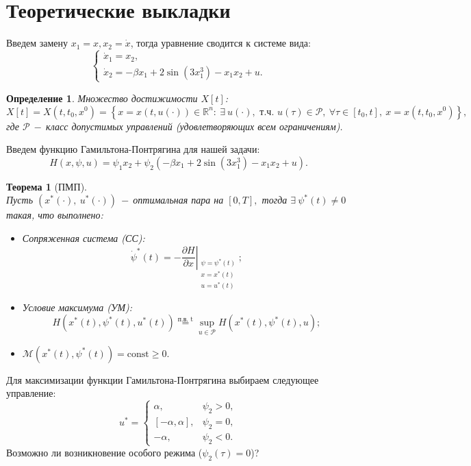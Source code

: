 \documentclass{article}
\begin{document}
\section{Теоретические выкладки}
Введем замену $x_1 = x, x_2 = \dot{x}$, тогда уравнение сводится к системе вида:
$$
\begin{cases}
    \dot{x}_1 = x_2,\\
    \dot{x}_2 = -\beta x_1 + 2\sin(3x_1^3) - x_1x_2 + u.
\end{cases}
$$
\newtheorem{определение}{Определение}
\begin{определение}
Множество достижимости $X[t]$:
$$X[t] = X(t, t_0, x^0) =  \left\{x = x(t, u(\cdot)) \in \mathbb{R}^n :~\exists~  u(\cdot) , \text{ т.ч. }  u(\tau)\in \mathcal{P},~ \forall \tau\in[t_0, t],  ~x = x(t, t_0, x^0)\right\},$$
где $\mathcal{P}~-~$класс допустимых управлений (удовлетворяющих всем ограничениям).
\end{определение}
Введем функцию Гамильтона-Понтрягина для нашей задачи:
$$H(x, \psi, u) = \psi_1x_2 + \psi_2(-\beta x_1 + 2\sin(3x_1^3) - x_1x_2 + u).$$
\newtheorem{теорема}{Теорема}
\begin{теорема}[ПМП]\\
Пусть $(x^*(\cdot), ~u^*(\cdot))~-~$оптимальная пара на $[0, T],$ тогда $\exists~ \psi^*(t) \neq 0$ такая, что выполнено:
\begin{itemize}
    \item [1)] Сопряженная система (СС):
    $$
    \left.\dot{\psi}^*(t) = -\dfrac{\partial H}{\partial x}\right\vert_{\substack{\psi = \psi^*(t)\\x=x^*(t) \\ u=u^*(t)}};
    $$
    \item[2)] Условие максимума (УМ):
    $$
    H(x^*(t), \psi^*(t), u^*(t)) \overset{\text{п.в. t}}{=} \sup_{u\in\mathcal{P}}H(x^*(t), \psi^*(t), u);
    $$
    \item[3)] $\mathcal{M} (x^*(t), \psi^*(t)) = \text{const} \geqslant 0.$
\end{itemize}
\end{теорема}
Для максимизации функции Гамильтона-Понтрягина выбираем следующее управление:
$$
u^* = 
\begin{cases}
    \alpha, & \psi_2 > 0,\\
    [-\alpha, \alpha], & \psi_2 = 0,\\
    -\alpha, & \psi_2 < 0.
\end{cases}
$$
Возможно ли возникновение особого режима ($\psi_2(\tau) = 0$)?\\
\end{document}
